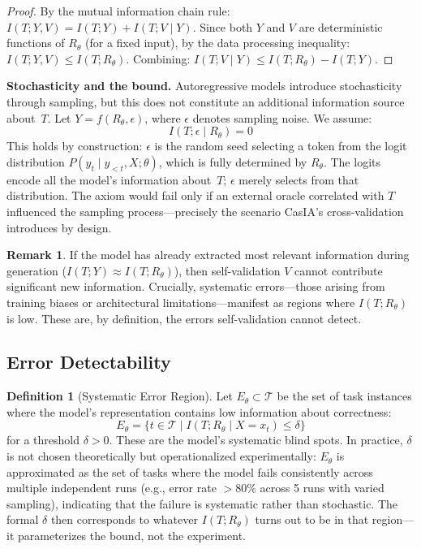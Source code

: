 \documentclass[11pt,a4paper]{article}
\theoremstyle{definition}
\newtheorem{definition}{Definition}[section]
\newtheorem{remark}{Remark}[section]
\newcommand{\Rtheta}{R_\theta}
\begin{document}
\begin{proof}
By the mutual information chain rule: $I(T; Y, V) = I(T; Y) + I(T; V \mid Y)$. Since both $Y$ and $V$ are deterministic functions of $\Rtheta$ (for a fixed input), by the data processing inequality: $I(T; Y, V) \leq I(T; \Rtheta)$. Combining: $I(T; V \mid Y) \leq I(T; \Rtheta) - I(T; Y)$.
\end{proof}

\textbf{Stochasticity and the bound.} Autoregressive models introduce stochasticity through sampling, but this does not constitute an additional information source about~$T$. Let $Y = f(\Rtheta, \epsilon)$, where $\epsilon$ denotes sampling noise. We assume:
\begin{equation}
I(T; \epsilon \mid \Rtheta) = 0
\end{equation}
This holds by construction: $\epsilon$ is the random seed selecting a token from the logit distribution $P(y_t \mid y_{<t}, X; \theta)$, which is fully determined by $\Rtheta$. The logits encode all the model's information about~$T$; $\epsilon$ merely selects from that distribution. The axiom would fail only if an external oracle correlated with $T$ influenced the sampling process---precisely the scenario CasIA's cross-validation introduces by design.

\begin{remark}
\label{rem:trapped}
If the model has already extracted most relevant information during generation ($I(T;Y) \approx I(T;\Rtheta)$), then self-validation $V$ cannot contribute significant new information. Crucially, systematic errors---those arising from training biases or architectural limitations---manifest as regions where $I(T;\Rtheta)$ is low. These are, by definition, the errors self-validation cannot detect.
\end{remark}


\subsection{Error Detectability}

\begin{definition}[Systematic Error Region]
\label{def:errorregion}
Let $E_\theta \subset \mathcal{T}$ be the set of task instances where the model's representation contains low information about correctness:
\begin{equation}
E_\theta = \{t \in \mathcal{T} \mid I(T; \Rtheta \mid X = x_t) \leq \delta\}
\end{equation}
for a threshold $\delta > 0$. These are the model's systematic blind spots. In practice, $\delta$ is not chosen theoretically but operationalized experimentally: $E_\theta$ is approximated as the set of tasks where the model fails consistently across multiple independent runs (e.g., error rate $> 80\%$ across 5 runs with varied sampling), indicating that the failure is systematic rather than stochastic. The formal $\delta$ then corresponds to whatever $I(T; \Rtheta)$ turns out to be in that region---it parameterizes the bound, not the experiment.
\end{definition}
\end{document}
